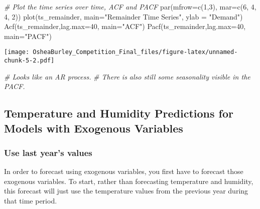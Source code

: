 \documentclass[
]{article}
\newenvironment{Shaded}{\begin{snugshade}}{\end{snugshade}}
\newcommand{\AttributeTok}[1]{\textcolor[rgb]{0.77,0.63,0.00}{#1}}
\newcommand{\CommentTok}[1]{\textcolor[rgb]{0.56,0.35,0.01}{\textit{#1}}}
\newcommand{\DecValTok}[1]{\textcolor[rgb]{0.00,0.00,0.81}{#1}}
\newcommand{\FunctionTok}[1]{\textcolor[rgb]{0.00,0.00,0.00}{#1}}
\newcommand{\NormalTok}[1]{#1}
\newcommand{\StringTok}[1]{\textcolor[rgb]{0.31,0.60,0.02}{#1}}
\begin{document}
\begin{Shaded}
\begin{Highlighting}[]
\CommentTok{\# Plot the time series over time, ACF and PACF}
\FunctionTok{par}\NormalTok{(}\AttributeTok{mfrow=}\FunctionTok{c}\NormalTok{(}\DecValTok{1}\NormalTok{,}\DecValTok{3}\NormalTok{), }\AttributeTok{mar=}\FunctionTok{c}\NormalTok{(}\DecValTok{6}\NormalTok{, }\DecValTok{4}\NormalTok{, }\DecValTok{4}\NormalTok{, }\DecValTok{2}\NormalTok{))}
\FunctionTok{plot}\NormalTok{(ts\_remainder, }\AttributeTok{main=}\StringTok{"Remainder Time Series"}\NormalTok{, }\AttributeTok{ylab =} \StringTok{"Demand"}\NormalTok{)}
\FunctionTok{Acf}\NormalTok{(ts\_remainder,}\AttributeTok{lag.max=}\DecValTok{40}\NormalTok{, }\AttributeTok{main=}\StringTok{"ACF"}\NormalTok{) }
\FunctionTok{Pacf}\NormalTok{(ts\_remainder,}\AttributeTok{lag.max=}\DecValTok{40}\NormalTok{, }\AttributeTok{main=}\StringTok{"PACF"}\NormalTok{)}
\end{Highlighting}
\end{Shaded}

\texttt{[image: OsheaBurley\_Competition\_Final\_files/figure-latex/unnamed-chunk-5-2.pdf]}

\begin{Shaded}
\begin{Highlighting}[]
  \CommentTok{\# Looks like an AR process.}
  \CommentTok{\# There is also still some seasonality visible in the PACF.}
\end{Highlighting}
\end{Shaded}

\hypertarget{temperature-and-humidity-predictions-for-models-with-exogenous-variables}{%
\subsection{Temperature and Humidity Predictions for Models with
Exogenous
Variables}\label{temperature-and-humidity-predictions-for-models-with-exogenous-variables}}

\hypertarget{use-last-years-values}{%
\subsubsection{Use last year's values}\label{use-last-years-values}}

In order to forecast using exogenous variables, you first have to
forecast those exogenous variables. To start, rather than forecasting
temperature and humidity, this forecast will just use the temperature
values from the previous year during that time period.
\end{document}
